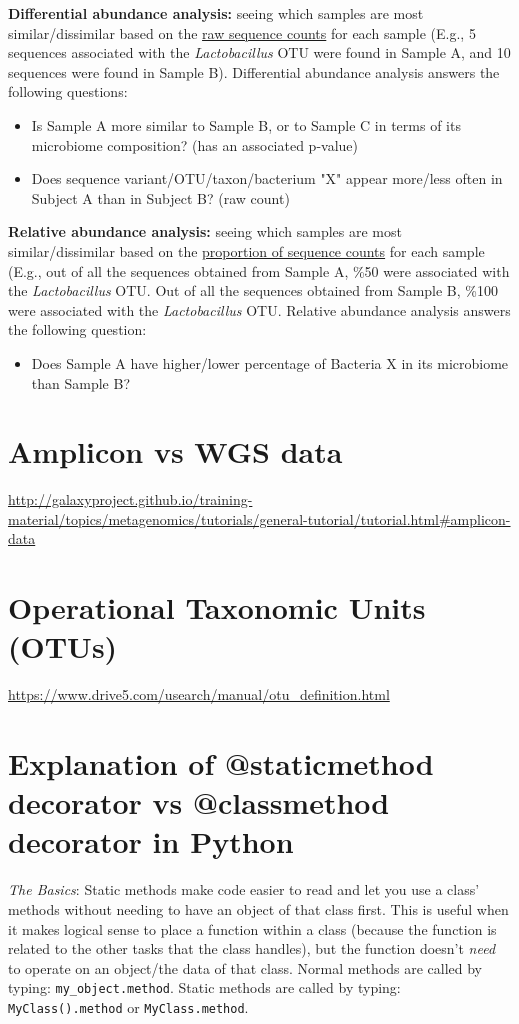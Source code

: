 \begin{fullpage}
    \textbf{Differential abundance analysis:} seeing which samples are most similar/dissimilar based on the \ul{raw sequence counts} for each sample (E.g., 5 sequences associated with the \textit{Lactobacillus} OTU were found in Sample A, and 10 sequences were found in Sample B). Differential abundance analysis answers the following questions:
    \begin{itemize}
        \item Is Sample A more similar to Sample B, or to Sample C in terms of its microbiome composition? (has an associated p-value)
        \item Does sequence variant/OTU/taxon/bacterium "X" appear more/less often in Subject A than in Subject B? (raw count) 
    \end{itemize}
    \textbf{Relative abundance analysis:} seeing which samples are most similar/dissimilar based on the \ul{proportion of sequence counts} for each sample (E.g., out of all the sequences obtained from Sample A, \%50 were associated with the \textit{Lactobacillus} OTU. Out of all the sequences obtained from Sample B, \%100 were associated with the \textit{Lactobacillus} OTU. Relative abundance analysis answers the following question:
    \begin{itemize}
    \item Does Sample A have higher/lower percentage of Bacteria X in its microbiome than Sample B?
    \end{itemize}
    


    \section{Amplicon vs WGS data}
    \label{appendix:amplicon}
    \url{http://galaxyproject.github.io/training-material/topics/metagenomics/tutorials/general-tutorial/tutorial.html#amplicon-data}

    \section{Operational Taxonomic Units (OTUs)}
    \label{appendix:otu}
    \url{https://www.drive5.com/usearch/manual/otu_definition.html}


    \section{Explanation of @staticmethod decorator vs @classmethod decorator in Python}
    \label{app:static-method}
    \textit{The Basics}: Static methods make code easier to read and let you use a class' methods without needing to have an object of that class first. This is useful when it makes logical sense to place a function within a class (because the function is related to the other tasks that the class handles), but the function doesn't \textit{need} to operate on an object/the data of that class. Normal methods are called by typing: \verb|my_object.method|. Static methods are called by typing: \verb|MyClass().method| or \verb|MyClass.method|.
    

\end{fullpage}
